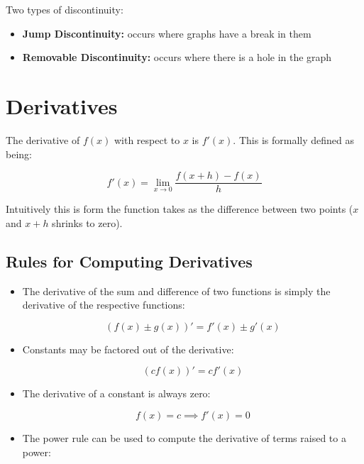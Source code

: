 \documentclass[8pt]{extarticle}
\begin{document}
\begin{multicols}{2}
\begin{enumerate}
Two types of discontinuity:
\begin{itemize}
	\item {\bf Jump Discontinuity:} occurs where graphs have a break in them
	\item {\bf Removable Discontinuity:} occurs where there is a hole in the graph
\end{itemize}

\end{enumerate}

\section{Derivatives}
The derivative of $f(x)$ with respect to $x$ is $f'(x)$. This is formally defined as being:

\begin{equation}
	f'(x) = \lim_{x \to 0} \frac{f(x+h) - f(x)}{h}
\end{equation}

Intuitively this is form the function takes as the difference between two points ($x$ and $x+h$ shrinks to zero).

\subsection{Rules for Computing Derivatives}

\begin{itemize}
	\item The derivative of the sum and difference of two functions is simply the derivative of the respective functions:

	\begin{equation}
		(f(x) \pm g(x))' = f'(x) \pm g'(x)
	\end{equation}
	
	\item Constants may be factored out of the derivative:
	
	\begin{equation}
		(cf(x))' = c f'(x)
	\end{equation}
	
	\item The derivative of a constant is always zero:

	\begin{equation}
		f(x) = c \implies f'(x) = 0
	\end{equation}
	
	\item The power rule can be used to compute the derivative of terms raised to a power:


\end{itemize}
\end{multicols}
\end{document}
